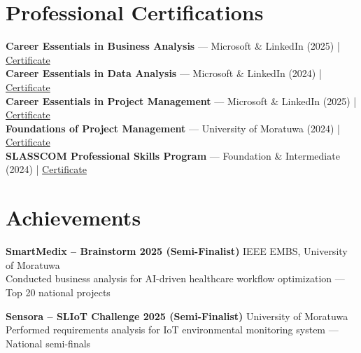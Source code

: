 \documentclass[letterpaper,10.8pt]{article}
\begin{document}
\section{Professional Certifications}
\vspace{-1pt}

\textbf{Career Essentials in Business Analysis} — Microsoft \& LinkedIn (2025) | \href{https://www.linkedin.com/posts/vindya-kodithuwakku-bb6187202_businessanalysis-careeressentials-microsoft-activity-7371193871919398914-PKak}{Certificate}\\[3pt]
\textbf{Career Essentials in Data Analysis} — Microsoft \& LinkedIn (2024) | \href{https://www.linkedin.com/posts/vindya-kodithuwakku-bb6187202_dataanalysis-careeressentials-microsoft-activity-7379124237950750720-kKmD}{Certificate}\\[3pt]
\textbf{Career Essentials in Project Management} — Microsoft \& LinkedIn (2025) | \href{https://www.linkedin.com/posts/vindya-kodithuwakku-bb6187202_projectmanagement-careeressentials-microsoft-activity-7374470702059438080-zbfj}{Certificate}\\[3pt]
\textbf{Foundations of Project Management} — University of Moratuwa (2024) | \href{https://open.uom.lk/lms/mod/customcert/verify_certificate.php?code=ATuxOYBBAE&qrcode=1}{Certificate}\\[3pt]
\textbf{SLASSCOM Professional Skills Program} — Foundation \& Intermediate (2024) | \href{https://www.linkedin.com/posts/vindya-kodithuwakku-bb6187202_slasscom-professionalskillsprogram-careerdevelopment-activity-7379038487246860288-PRA0}{Certificate}

\section{Achievements}
\vspace{-1pt}

\noindent\textbf{SmartMedix – Brainstorm 2025 (Semi-Finalist)} \hfill IEEE EMBS, University of Moratuwa\\
Conducted business analysis for AI-driven healthcare workflow optimization — Top 20 national projects

\vspace{5pt}
\noindent\textbf{Sensora – SLIoT Challenge 2025 (Semi-Finalist)} \hfill University of Moratuwa\\
Performed requirements analysis for IoT environmental monitoring system — National semi-finals
\end{document}
